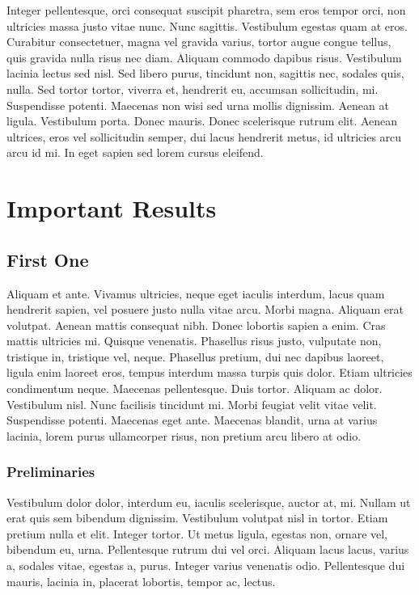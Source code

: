 \documentclass[a4paper,11pt]{kth-mag}
\begin{document}
Integer pellentesque, orci consequat suscipit pharetra, sem eros
tempor orci, non ultricies massa justo vitae nunc. Nunc sagittis.
Vestibulum egestas quam at eros. Curabitur consectetuer, magna vel
gravida varius, tortor augue congue tellus, quis gravida nulla risus
nec diam. Aliquam commodo dapibus risus. Vestibulum lacinia lectus sed
nisl. Sed libero purus, tincidunt non, sagittis nec, sodales quis,
nulla. Sed tortor tortor, viverra et, hendrerit eu, accumsan
sollicitudin, mi. Suspendisse potenti. Maecenas non wisi sed urna
mollis dignissim. Aenean at ligula. Vestibulum porta. Donec mauris.
Donec scelerisque rutrum elit. Aenean ultrices, eros vel sollicitudin
semper, dui lacus hendrerit metus, id ultricies arcu arcu id mi. In
eget sapien sed lorem cursus eleifend.

\part{Important Results}

\chapter{First One}

Aliquam et ante. Vivamus ultricies, neque eget iaculis interdum, lacus
quam hendrerit sapien, vel posuere justo nulla vitae arcu. Morbi
magna. Aliquam erat volutpat. Aenean mattis consequat nibh. Donec
lobortis sapien a enim. Cras mattis ultricies mi. Quisque venenatis.
Phasellus risus justo, vulputate non, tristique in, tristique vel,
neque. Phasellus pretium, dui nec dapibus laoreet, ligula enim laoreet
eros, tempus interdum massa turpis quis dolor. Etiam ultricies
condimentum neque. Maecenas pellentesque. Duis tortor. Aliquam ac
dolor. Vestibulum nisl. Nunc facilisis tincidunt mi. Morbi feugiat
velit vitae velit. Suspendisse potenti. Maecenas eget ante. Maecenas
blandit, urna at varius lacinia, lorem purus ullamcorper risus, non
pretium arcu libero at odio.

\section{Preliminaries}

Vestibulum dolor dolor, interdum eu, iaculis scelerisque, auctor at,
mi. Nullam ut erat quis sem bibendum dignissim. Vestibulum volutpat
nisl in tortor. Etiam pretium nulla et elit. Integer tortor. Ut metus
ligula, egestas non, ornare vel, bibendum eu, urna. Pellentesque
rutrum dui vel orci. Aliquam lacus lacus, varius a, sodales vitae,
egestas a, purus. Integer varius venenatis odio. Pellentesque dui
mauris, lacinia in, placerat lobortis, tempor ac, lectus.
\end{document}
